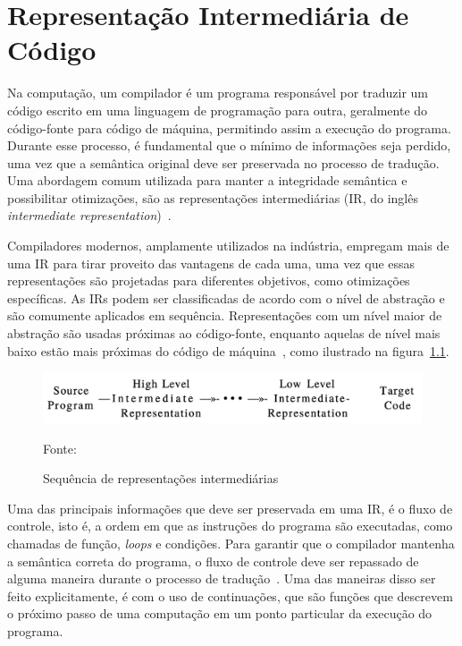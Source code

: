 \chapter{Representação Intermediária de Código}\label{ch:IR}

Na computação, um compilador é um programa responsável por traduzir um código escrito em uma linguagem de programação para outra, geralmente do código-fonte para código de máquina, permitindo assim a execução do programa.
Durante esse processo, é fundamental que o mínimo de informações seja perdido, uma vez que a semântica original deve ser preservada no processo de tradução.
Uma abordagem comum utilizada para manter a integridade semântica e possibilitar otimizações, são as representações intermediárias (IR, do inglês \textit{intermediate representation})~\cite{cooper2014}.

Compiladores modernos, amplamente utilizados na indústria, empregam mais de uma IR para tirar proveito das vantagens de cada uma, uma vez que essas representações são projetadas para diferentes objetivos, como otimizações específicas.
As IRs podem ser classificadas de acordo com o nível de abstração e são comumente aplicados em sequência.
Representações com um nível maior de abstração são usadas próximas ao código-fonte, enquanto aquelas de nível mais baixo estão mais próximas do código de máquina~\cite{aho2008compilers}, como ilustrado na figura~\ref{fig:abstraction-level-irs}.

\begin{figure}
  \centering
  \includegraphics[width=.7\textwidth]{Imagens/abstraction-level-irs.png}
  \caption{Sequência de representações intermediárias}\label{fig:abstraction-level-irs}
  \small{Fonte:~\cite{aho2008compilers}}
\end{figure}

Uma das principais informações que deve ser preservada em uma IR, é o fluxo de controle, isto é, a ordem em que as instruções do programa são executadas, como chamadas de função, \textit{loops} e condições.
Para garantir que o compilador mantenha a semântica correta do programa, o fluxo de controle deve ser repassado de alguma maneira durante o processo de tradução~\cite{cooper2014}.
Uma das maneiras disso ser feito explicitamente, é com o uso de continuações, que são funções que descrevem o próximo passo de uma computação em um ponto particular da execução do programa.

